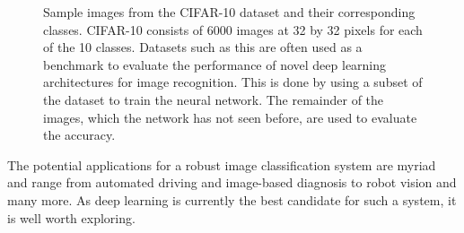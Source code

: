 \begin{figure}
    \centering
{}
\caption[CIFAR-10 classes and sample images]{Sample images from the CIFAR-10 \cite{cifar10} dataset and their corresponding classes. CIFAR-10 consists of 6000 images at 32 by 32 pixels for each of the 10 classes. Datasets such as this are often used as a benchmark to evaluate the performance of novel deep learning architectures for image recognition. This is done by using a subset of the dataset to train the neural network. The remainder of the images, which the network has not seen before, are used to evaluate the accuracy.}\label{fig:cifar10}
\end{figure}\noindent
The potential applications for a robust image classification system are myriad and range from automated driving and image-based diagnosis to robot vision and many more. As deep learning is currently the best candidate for such a system, it is well worth exploring.
